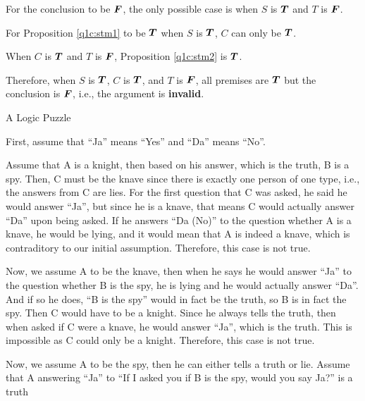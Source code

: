 \documentclass[answers]{exam}
\begin{document}
\begin{questions}
\begin{parts}
\begin{solution}
            For the conclusion to be $\bm{F}$, the only possible case is when $S$ is $\bm{T}$ and
            $T$ is $\bm{F}$.

            For Proposition \ref{q1c:stm1} to be $\bm{T}$ when $S$ is $\bm{T}$, $C$ can only be
            $\bm{T}$.
            
            When $C$ is $\bm{T}$ and $T$ is $\bm{F}$, Proposition \ref{q1c:stm2} is $\bm{T}$.

            Therefore, when $S$ is $\bm{T}$, $C$ is $\bm{T}$, and $T$ is $\bm{F}$, all premises
            are $\bm{T}$ but the conclusion is $\bm{F}$, i.e., the argument is \textbf{invalid}.
        \end{solution}

    \end{parts}

    \question A Logic Puzzle

    \begin{solution}
        First, assume that ``Ja'' means ``Yes'' and ``Da'' means ``No''.

        Assume that A is a knight, then based on his answer, which is the truth, B is
        a spy. Then, C must be the knave since there is exactly one person of one type,
        i.e., the answers from C are lies. For the first question that C was asked,
        he said he would answer ``Ja'', but since he is a knave, that means C would
        actually answer ``Da'' upon being asked. If he answers ``Da (No)'' to the question
        whether A is a knave, he would be lying, and it would mean that A is indeed a
        knave, which is contraditory to our initial assumption. Therefore, this case
        is not true.

        Now, we assume A to be the knave, then when he says he would answer ``Ja'' to
        the question whether B is the spy, he is lying and he would actually answer ``Da''.
        And if so he does, ``B is the spy'' would in fact be the truth, so B is in fact
        the spy. Then C would have to be a knight. Since he always tells the truth, then
        when asked if C were a knave, he would answer ``Ja'', which is the truth. This is
        impossible as C could only be a knight. Therefore, this case is not true.

        Now, we assume A to be the spy, then he can either tells a truth or lie. Assume
        that A answering ``Ja'' to ``If I asked you if B is the spy, would you say Ja?''
        is a truth
    \end{solution}


\end{questions}
\end{document}
